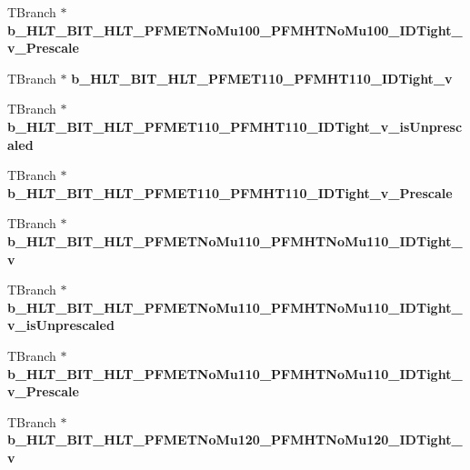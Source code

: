 \begin{DoxyCompactItemize}
T\+Branch $\ast$ {\bfseries b\+\_\+\+H\+L\+T\+\_\+\+B\+I\+T\+\_\+\+H\+L\+T\+\_\+\+P\+F\+M\+E\+T\+No\+Mu100\+\_\+\+P\+F\+M\+H\+T\+No\+Mu100\+\_\+\+I\+D\+Tight\+\_\+v\+\_\+\+Prescale}
\item 
\hypertarget{classMiniTree_add861d51aa594dd39cdacdd54bcaf180}{}\label{classMiniTree_add861d51aa594dd39cdacdd54bcaf180} 
T\+Branch $\ast$ {\bfseries b\+\_\+\+H\+L\+T\+\_\+\+B\+I\+T\+\_\+\+H\+L\+T\+\_\+\+P\+F\+M\+E\+T110\+\_\+\+P\+F\+M\+H\+T110\+\_\+\+I\+D\+Tight\+\_\+v}
\item 
\hypertarget{classMiniTree_adaff60b87baa5c32ae63981b20e01b70}{}\label{classMiniTree_adaff60b87baa5c32ae63981b20e01b70} 
T\+Branch $\ast$ {\bfseries b\+\_\+\+H\+L\+T\+\_\+\+B\+I\+T\+\_\+\+H\+L\+T\+\_\+\+P\+F\+M\+E\+T110\+\_\+\+P\+F\+M\+H\+T110\+\_\+\+I\+D\+Tight\+\_\+v\+\_\+is\+Unprescaled}
\item 
\hypertarget{classMiniTree_a3e91a848612b5ca2bba5b0c9f7956e65}{}\label{classMiniTree_a3e91a848612b5ca2bba5b0c9f7956e65} 
T\+Branch $\ast$ {\bfseries b\+\_\+\+H\+L\+T\+\_\+\+B\+I\+T\+\_\+\+H\+L\+T\+\_\+\+P\+F\+M\+E\+T110\+\_\+\+P\+F\+M\+H\+T110\+\_\+\+I\+D\+Tight\+\_\+v\+\_\+\+Prescale}
\item 
\hypertarget{classMiniTree_ac74c303526eda0d25a0ffd5132a35ebd}{}\label{classMiniTree_ac74c303526eda0d25a0ffd5132a35ebd} 
T\+Branch $\ast$ {\bfseries b\+\_\+\+H\+L\+T\+\_\+\+B\+I\+T\+\_\+\+H\+L\+T\+\_\+\+P\+F\+M\+E\+T\+No\+Mu110\+\_\+\+P\+F\+M\+H\+T\+No\+Mu110\+\_\+\+I\+D\+Tight\+\_\+v}
\item 
\hypertarget{classMiniTree_af39ec4949e55152474fa4dfcf7b2a584}{}\label{classMiniTree_af39ec4949e55152474fa4dfcf7b2a584} 
T\+Branch $\ast$ {\bfseries b\+\_\+\+H\+L\+T\+\_\+\+B\+I\+T\+\_\+\+H\+L\+T\+\_\+\+P\+F\+M\+E\+T\+No\+Mu110\+\_\+\+P\+F\+M\+H\+T\+No\+Mu110\+\_\+\+I\+D\+Tight\+\_\+v\+\_\+is\+Unprescaled}
\item 
\hypertarget{classMiniTree_a1207e942a9dbb6b2304c3f55d76e09ed}{}\label{classMiniTree_a1207e942a9dbb6b2304c3f55d76e09ed} 
T\+Branch $\ast$ {\bfseries b\+\_\+\+H\+L\+T\+\_\+\+B\+I\+T\+\_\+\+H\+L\+T\+\_\+\+P\+F\+M\+E\+T\+No\+Mu110\+\_\+\+P\+F\+M\+H\+T\+No\+Mu110\+\_\+\+I\+D\+Tight\+\_\+v\+\_\+\+Prescale}
\item 
\hypertarget{classMiniTree_ae420450219fb72bad5fb00a7d8af9acd}{}\label{classMiniTree_ae420450219fb72bad5fb00a7d8af9acd} 
T\+Branch $\ast$ {\bfseries b\+\_\+\+H\+L\+T\+\_\+\+B\+I\+T\+\_\+\+H\+L\+T\+\_\+\+P\+F\+M\+E\+T\+No\+Mu120\+\_\+\+P\+F\+M\+H\+T\+No\+Mu120\+\_\+\+I\+D\+Tight\+\_\+v}
\item 
\hypertarget{classMiniTree_a6c0de9adc8e4274792c12fe47ef005cf}{}\label{classMiniTree_a6c0de9adc8e4274792c12fe47ef005cf} 

\end{DoxyCompactItemize}
